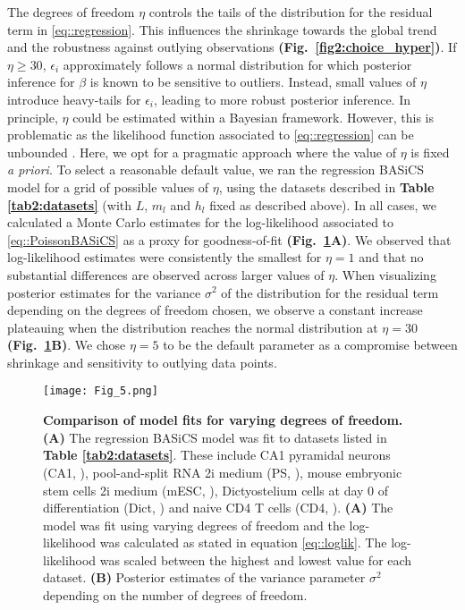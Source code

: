 \newpage

The degrees of freedom $\eta$ controls the tails of the distribution for the residual term in \ref{eq::regression}. This influences the shrinkage towards the global trend and the robustness against outlying observations \textbf{(Fig.~\ref{fig2:choice_hyper})}.  If $\eta \geq 30$, $\epsilon_i$ approximately follows a normal distribution for which posterior inference for $\beta$ is known to be sensitive to outliers. Instead, small values of $\eta$ introduce heavy-tails for $\epsilon_i$, leading to more robust posterior inference. In principle, $\eta$ could be estimated within a Bayesian framework. However, this is problematic as the likelihood function associated to \ref{eq::regression} can be unbounded \citep{Fernandez1999}. Here, we opt for a pragmatic approach where the value of $\eta$ is fixed \emph{a priori}. To select a reasonable default value, we ran the regression BASiCS model for a grid of possible values of $\eta$, using the datasets described in \textbf{Table \ref{tab2:datasets}} (with $L$, $m_l$ and $h_l$ fixed as described above). In all cases, we calculated a Monte Carlo estimates for the log-likelihood associated to \ref{eq::PoissonBASiCS} as a proxy for goodness-of-fit \textbf{(Fig.~\ref{fig2:DoF}A)}. We observed that log-likelihood estimates were consistently the smallest for $\eta=1$ and that no substantial differences are observed across larger values of $\eta$. When visualizing posterior estimates for the variance $\sigma^2$ of the distribution for the residual term depending on the degrees of freedom chosen, we observe a constant increase plateauing when the distribution reaches the normal distribution at $\eta=30$ \textbf{(Fig.~\ref{fig2:DoF}B)}. We chose $\eta=5$ to be the default parameter as a compromise between shrinkage and sensitivity to outlying data points. 

\begin{figure}[!h]
\centering
\texttt{[image: Fig\_5.png]}
\caption[Comparison of model fits for varying degrees of freedom]{\textbf{Comparison of model fits for varying degrees of freedom.}\\
\textbf{(A)} The regression BASiCS model was fit to datasets listed in \textbf{Table \ref{tab2:datasets}}. These include CA1 pyramidal neurons (CA1, \citep{Zeisel2015}), pool-and-split RNA 2i medium (PS, \citep{Grun2014}), mouse embryonic stem cells 2i medium (mESC, \citep{Grun2014}), Dictyostelium cells at day 0 of differentiation (Dict, \citep{Antolovic2017}) and naive CD4\plus{} T cells (CD4, \citep{Martinez-jimenez2017}). \textbf{(A)} The model was fit using varying degrees of freedom and the log-likelihood was calculated as stated in equation \ref{eq::loglik}. The log-likelihood was scaled between the highest and lowest value for each dataset. \textbf{(B)} Posterior estimates of the variance parameter $\sigma^2$ depending on the number of degrees of freedom.}
\label{fig2:DoF}
\end{figure}

